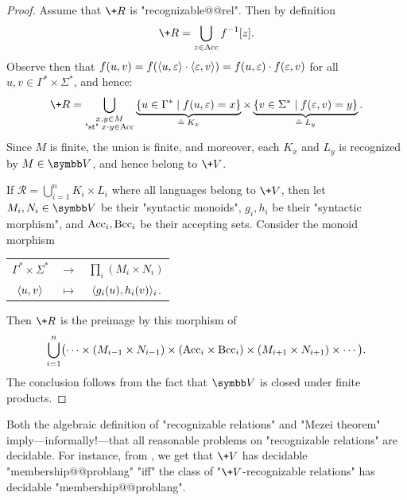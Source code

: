 \begin{proof}
	Assume that $\+R$ is "recognizable@@rel". 
	Then by definition
	\[
		\+R = \bigcup_{z \in \Acc} f^{-1}[z].
	\]
	Observe then that $f(u,v) = f(\langle u,\varepsilon\rangle\cdot\langle\varepsilon,v\rangle)
	= f(u,\varepsilon)\cdot f(\varepsilon,v)$ for all $u,v \in \Gamma^* \times \Sigma^*$, and hence:
	\[
		\+R = \bigcup_{\substack{x,y \in M\\ \text{"st" } x\cdot y \in \Acc}}
		\underbrace{\{u \in \Gamma^* \mid f(u, \varepsilon) = x\}}_{\defeq \;K_x}
		\times \underbrace{\{v \in \Sigma^* \mid f(\varepsilon, v) = y\}}_{\defeq \;L_y}.
	\]
	Since $M$ is finite, the union is finite, and moreover, each $K_x$ and $L_y$ is
	recognized by $M \in \B{V}$, and hence belong to $\+V$.

	 If $\mathcal{R} = \bigcup_{i=1}^n K_i \times L_i$ 
		where all languages belong to $\+V$, then let $M_i,N_i \in \B{V}$
		be their "syntactic monoids", $g_i,h_i$ be their
		"syntactic morphism", and $\textrm{Acc}_i,\textrm{Bcc}_i$ be their accepting sets.
		Consider the monoid morphism
		\begin{center}
		\begin{tabular}{ccc}
			$\Gamma^* \times \Sigma^*$ & $\to$ & $\prod_{i}(M_i \times N_i)$ \\
			$\langle u,v\rangle$ & $\mapsto$ & $\langle g_i(u), h_i(v)\rangle_{i}$.
		\end{tabular}
		\end{center}
		Then $\+R$ is the preimage by this morphism of
		\[
			\bigcup_{i=1}^n \bigl(
			\cdots \times (M_{i-1}\times N_{i-1}) \times
			(\textrm{Acc}_i \times \textrm{Bcc}_i) \times (M_{i+1}\times N_{i+1}) \times \cdots \bigr).
		\]
		The conclusion follows from the fact that $\B{V}$ is closed under finite products.
\end{proof}

Both the algebraic definition of "recognizable relations" and
"Mezei theorem" imply---informally!---that all reasonable problems on
"recognizable relations" are decidable. For instance, from ,
we get that $\+V$ has decidable "membership@@problang" "iff" the class of "$\+V$-recognizable relations"
has decidable "membership@@problang".

